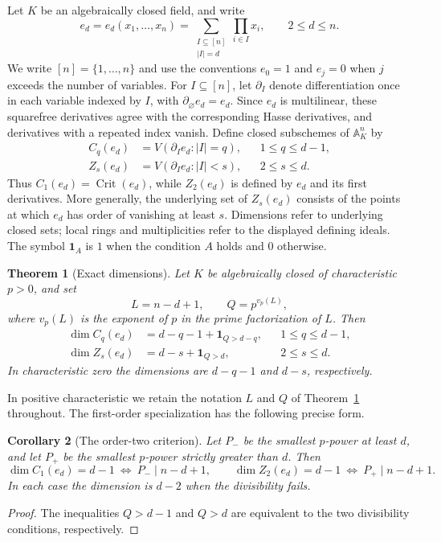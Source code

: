 \documentclass[11pt]{article}
\newtheorem{theorem}{Theorem}[section]
\newtheorem{corollary}[theorem]{Corollary}
\theoremstyle{remark}
\newcommand{\A}{\mathbb A}
\newcommand{\ind}{\mathbf 1}
\newcommand{\Crit}{\operatorname{Crit}}
\begin{document}
Let $K$ be an algebraically closed field, and write
\[
 e_d=e_d(x_1,\ldots,x_n)
 =\sum_{\substack{I\subseteq[n]\\|I|=d}}\prod_{i\in I}x_i,
 \qquad 2\le d\le n.
\]
We write $[n]=\{1,\ldots,n\}$ and use the conventions $e_0=1$
and $e_j=0$ when $j$ exceeds the number of variables. For $I\subseteq[n]$, let $\partial_I$ denote
differentiation once in each variable indexed by $I$, with
$\partial_\varnothing e_d=e_d$. Since $e_d$ is multilinear, these
squarefree derivatives agree with the corresponding Hasse derivatives,
and derivatives with a repeated index vanish. Define closed subschemes
of $\A^n_K$ by
\begin{align}
 C_q(e_d)&=V(\partial_Ie_d:|I|=q),
 &&1\le q\le d-1,\label{eq:Cdef}\\
 Z_s(e_d)&=V(\partial_Ie_d:|I|<s),
 &&2\le s\le d.\label{eq:Zdef}
\end{align}
Thus $C_1(e_d)=\Crit(e_d)$, while $Z_2(e_d)$ is defined by $e_d$
and its first derivatives. More generally, the underlying set of
$Z_s(e_d)$ consists of the points at which $e_d$ has order of
vanishing at least $s$. Dimensions refer to underlying closed sets;
local rings and multiplicities refer to the displayed defining ideals.
The symbol $\ind_A$ is $1$ when the condition $A$ holds and $0$ otherwise.

\begin{theorem}[Exact dimensions]\label{thm:dimensions}
Let $K$ be algebraically closed of characteristic $p>0$, and set
\[
 L=n-d+1,\qquad Q=p^{v_p(L)},
\]
where $v_p(L)$ is the exponent of $p$ in the prime factorization of $L$.
Then
\begin{align}
 \dim C_q(e_d)&=d-q-1+\ind_{Q>d-q},&&1\le q\le d-1,\label{eq:Cdim}\\
 \dim Z_s(e_d)&=d-s+\ind_{Q>d},&&2\le s\le d.\label{eq:Zdim}
\end{align}
In characteristic zero the dimensions are $d-q-1$ and $d-s$,
respectively.
\end{theorem}

In positive characteristic we retain the notation $L$ and $Q$ of
Theorem~\ref{thm:dimensions} throughout. The first-order specialization
has the following precise form.

\begin{corollary}[The order-two criterion]\label{cor:criterion}
Let $P_-$ be the smallest $p$-power at least $d$, and let $P_+$ be
the smallest $p$-power strictly greater than $d$. Then
\[
 \dim C_1(e_d)=d-1\ \Longleftrightarrow\ P_-\mid n-d+1,
 \qquad
 \dim Z_2(e_d)=d-1\ \Longleftrightarrow\ P_+\mid n-d+1.
\]
In each case the dimension is $d-2$ when the divisibility fails.
\end{corollary}
\begin{proof}
The inequalities $Q>d-1$ and $Q>d$ are equivalent to the two
divisibility conditions, respectively.
\end{proof}
\end{document}
